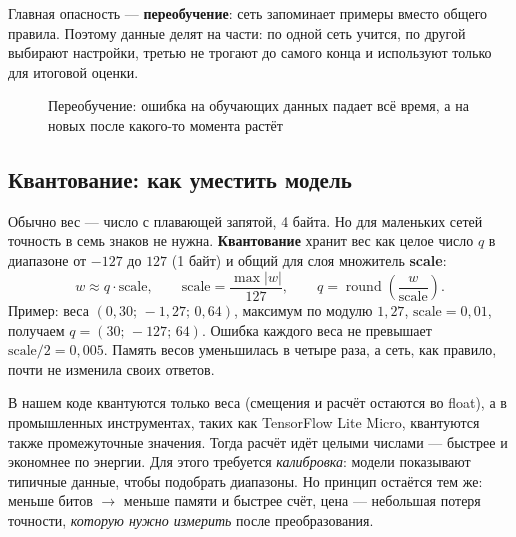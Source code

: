 Главная опасность --- \textbf{переобучение}: сеть запоминает примеры вместо общего правила.
Поэтому данные делят на части: по одной сеть учится, по другой выбирают настройки,
третью не трогают до самого конца и используют только для итоговой оценки.

\begin{figure}[H]
\centering
{}
\caption{Переобучение: ошибка на обучающих данных падает всё время, а на новых после какого-то момента растёт}
\end{figure}

\subsection{Квантование: как уместить модель}

Обычно вес --- число с плавающей запятой, 4 байта. Но для маленьких сетей точность в семь
знаков не нужна. \textbf{Квантование} хранит вес как целое число $q$ в диапазоне от $-127$ до $127$
(1 байт) и общий для слоя множитель \textbf{scale}:
\[
w \approx q\cdot\text{scale},\qquad \text{scale}=\frac{\max|w|}{127},\qquad q=\operatorname{round}\!\left(\frac{w}{\text{scale}}\right).
\]
Пример: веса $(0{,}30;\,-1{,}27;\,0{,}64)$, максимум по модулю $1{,}27$, $\text{scale}=0{,}01$,
получаем $q=(30;\,-127;\,64)$. Ошибка каждого веса не превышает $\text{scale}/2=0{,}005$.
Память весов уменьшилась в четыре раза, а сеть, как правило, почти не изменила своих ответов.

В нашем коде квантуются только веса (смещения и расчёт остаются во float), а в промышленных
инструментах, таких как TensorFlow Lite Micro, квантуются также промежуточные значения.
Тогда расчёт идёт целыми числами --- быстрее и экономнее по энергии. Для этого требуется
\emph{калибровка}: модели показывают типичные данные, чтобы подобрать диапазоны.
Но принцип остаётся тем же: меньше битов $\to$ меньше памяти и быстрее счёт, цена --- небольшая
потеря точности, \emph{которую нужно измерить} после преобразования.

